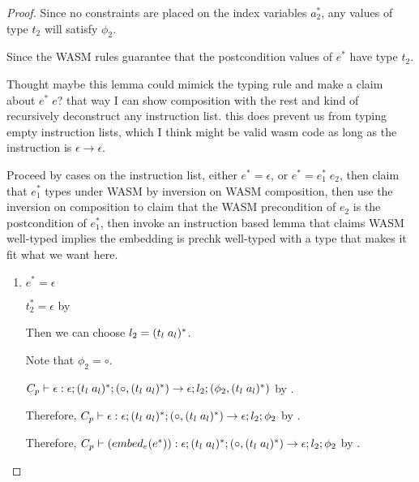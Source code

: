 \begin{proof}


    Since no constraints are placed on the index variables $a_2^{*}$, any values of type $t_2$ will satisfy $\phi_2$.

    Since the WASM rules guarantee that the postcondition values of $e^{*}$ have type $t_2$.


    Thought maybe this lemma could mimick the typing rule and make a claim about $e^{*}\;e$? that way I can show composition with the rest and kind of recursively deconstruct any instruction list.
    this does prevent us from typing empty instruction lists, which I think might be valid wasm code as long as the instruction is $\epsilon \rightarrow \epsilon$.

    Proceed by cases on the instruction list, either $e^{*} = \epsilon$, or $e^{*} = e_1^{*}\; e_2$, then claim that $e_1^{*}$ types under WASM by inversion on WASM composition,
    then use the inversion on composition to claim that the WASM precondition of $e_2$ is the postcondition of $e_1^{*}$, then invoke an instruction based lemma that claims WASM well-typed
    implies the embedding is prechk well-typed with a type that makes it fit what we want here.

    \begin{enumerate}
        \item $e^{*} = \epsilon$

        $t_2^{*} = \epsilon$ by 

        Then we can choose $l_2 = \ti{t_l}{a_l}^{*}$.

        Note that $\phi_2 = \circ$.

        $C_p \vdash \epsilon : \epsilon;\ti{t_l}{a_l}^{*};(\circ,\ti{t_l}{a_l}^{*}) \rightarrow \epsilon;l_2;(\phi_2,\ti{t_l}{a_l}^{*})$ by .

        Therefore, $C_p \vdash \epsilon : \epsilon;\ti{t_l}{a_l}^{*};(\circ,\ti{t_l}{a_l}^{*}) \rightarrow \epsilon;l_2;\phi_2$ by .

        Therefore, $C_p \vdash (\embed[e]{e^{*}}) : \epsilon;\ti{t_l}{a_l}^{*};(\circ,\ti{t_l}{a_l}^{*}) \rightarrow \epsilon;l_2;\phi_2$ by .


\end{enumerate}
\end{proof}
